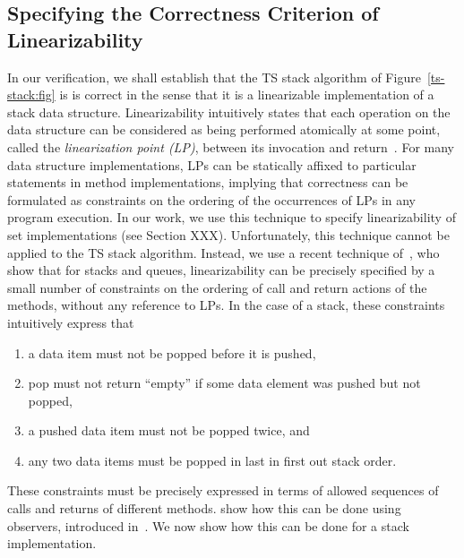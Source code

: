 \subsection{Specifying the Correctness Criterion of Linearizability}
In our verification, we shall establish that the TS stack algorithm of
Figure~\ref{ts-stack:fig} is is correct in the sense that it is a
linearizable implementation of a stack data structure.
Linearizability intuitively states that
each operation on the data structure can be considered as being
performed atomically at some point, called the {\em linearization point (LP)},
between its invocation and return~\cite{HeWi:linearizability}.
For many data structure implementations, LPs can be statically
affixed to particular statements in method implementations,
implying that correctness can be formulated as constraints on the ordering of the
occurrences of LPs in any program execution.
In our work, we use this technique to specify linearizability of
set implementations (see Section XXX).
Unfortunately, this technique cannot be applied to the TS stack algorithm.
Instead, we use a recent technique of~\cite{BEEH:icalp15,HSV:concur13}, who show
that for stacks and queues,
linearizability can be precisely specified by a small number of
constraints on the ordering of call and return actions of the methods,
without any reference to LPs.
In the case of a stack, these constraints intuitively express that
\begin{enumerate}
\item a data item must not be popped before it is pushed,
\item pop must not return ``empty'' if some data element was pushed but not
  popped,
\item a pushed data item must not be popped twice, and
\item any two data items must be popped in last in first out stack order.%
\end{enumerate}
These constraints must be precisely expressed in terms of allowed
sequences of calls
and returns of different methods. \cite{BEEH:icalp15} show how this can be
done using observers, introduced in~\cite{AHHR:integrated}. 
We now show how this can be done for a stack implementation.

